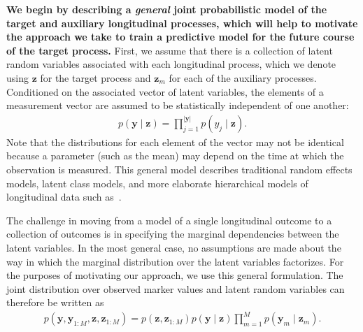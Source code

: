 \documentclass[12pt]{article}
\newcommand{\given}{\mid}
\begin{document}
\textbf{We begin by describing a \emph{general} joint probabilistic model of the target and auxiliary longitudinal processes, which will help to motivate the approach we take to train a predictive model for the future course of the target process.} First, we assume that there is a collection of latent random variables associated with each longitudinal process, which we denote using $\bm{z}$ for the target process and $\bm{z}_m$ for each of the auxiliary processes. Conditioned on the associated vector of latent variables, the elements of a measurement vector are assumed to be statistically independent of one another:
\begin{align}
p(\bm{y} \given \bm{z}) = \prod_{j=1}^{|\bm{y}|} p( y_j \given \bm{z} ).
\end{align}
Note that the distributions for each element of the vector may not be identical because a parameter (such as the mean) may depend on the time at which the observation is measured. This general model describes traditional random effects models, latent class models, and more elaborate hierarchical models of longitudinal data such as~\cite{Schulam2015-ah}.

The challenge in moving from a model of a single longitudinal outcome to a collection of outcomes is in specifying the marginal dependencies between the latent variables. In the most general case, no assumptions are made about the way in which the marginal distribution over the latent variables factorizes. For the purposes of motivating our approach, we use this general formulation. The joint distribution over observed marker values and latent random variables can therefore be written as
\begin{align}
p(\bm{y}, \bm{y}_{1:M}, \bm{z}, \bm{z}_{1:M}) = p(\bm{z}, \bm{z}_{1:M}) p(\bm{y} \given \bm{z}) \prod_{m=1}^M p(\bm{y}_m \given \bm{z}_m).
\end{align}
\end{document}

